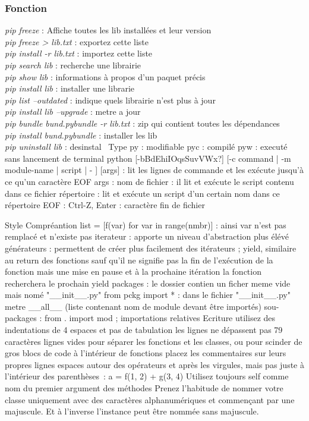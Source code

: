 \documentclass[a4paper,12pt]{report}
\begin{document}
		\subsubsection{Fonction}
			\textit{pip freeze} : Affiche toutes les lib installées et leur version\\
			\textit{pip freeze > lib.txt} : exportez cette liste\\
			\textit{pip install -r lib.txt} : importez cette liste\\
			\textit{pip search lib} : recherche une librairie\\
			\textit{pip show lib} : informations à propos d'un paquet précis\\
			\textit{pip install lib} : installer une librarie\\
			\textit{pip list --outdated} : indique quels librairie n'est plus à jour\\
			\textit{pip install lib --upgrade} : metre a jour\\
			\textit{pip bundle bund.pybundle -r lib.txt} : zip qui contient toutes les dépendances\\
			\textit{pip install bund.pybundle} : installer les lib\\
			\textit{pip uninstall lib} : desinstal
	\
	Type
		py : modifiable
		pyc : compilé
		pyw : executé sans lancement de terminal
	python [-bBdEhiIOqsSuvVWx?] [-c command | -m module-name | script | - ] [args] : lit les lignes de commande et les exécute jusqu'à ce qu'un caractère EOF
		args :
			nom de fichier : il lit et exécute le script contenu dans ce fichier
			répertoire : lit et exécute un script d’un certain nom dans ce répertoire
		EOF :
			Ctrl-Z, Enter : caractère fin de fichier
		
Style
	Compréantion
		list = [f(var) for var in range(nmbr)] : ainsi var n'est pas remplacé et n'existe pas
		iterateur : apporte un niveau d'abstraction plus élévé
		générateurs : permettent de créer plus facilement des itérateurs ; yield, similaire au return des fonctions sauf qu'il ne signifie pas la fin de l'exécution de la fonction mais une mise en pause et à la prochaine itération la fonction recherchera le prochain yield
		packages : le dossier contien un ficher meme vide mais nomé "\_\_init\_\_.py"
		from pckg import * : dans le fichier "\_\_init\_\_.py" metre \_\_all\_\_ (liste contenant nom de module devant être importés)
		sou-packages :  from . import mod ; importations relatives
	Ecriture
		utilisez des indentations de 4 espaces et pas de tabulation
		les lignes ne dépassent pas 79 caractères
		lignes vides pour séparer les fonctions et les classes, ou pour scinder de gros blocs de code à l'intérieur de fonctions
		placez les commentaires sur leurs propres lignes
		espaces autour des opérateurs et après les virgules, mais pas juste à l'intérieur des parenthèses : a = f(1, 2) + g(3, 4)
		Utilisez toujours self comme nom du premier argument des méthodes
		Prenez l'habitude de nommer votre classe uniquement avec des caractères alphanumériques et commençant par une majuscule. Et à l'inverse l'instance peut être nommée sans majuscule.
\end{document}
